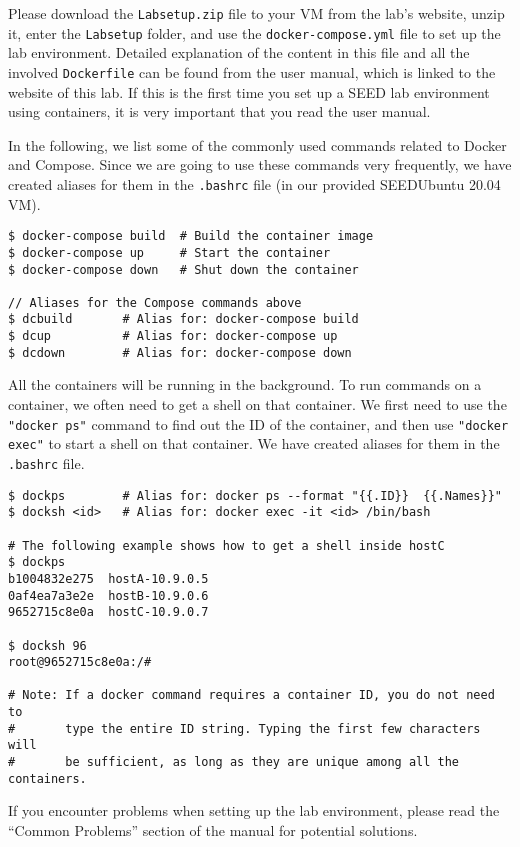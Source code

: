 Please download the
\texttt{Labsetup.zip} file to your VM from the lab's website,
unzip it, enter the \texttt{Labsetup} folder, and 
use the \texttt{docker-compose.yml} file to 
set up the lab environment. Detailed explanation
of the content in this file and all the involved 
\texttt{Dockerfile} can be found from the 
user manual, which is linked to the website of this lab.
If this is the first time you set up a SEED lab environment
using containers, it is very important that you read 
the user manual. 

In the following, we list some of the commonly
used commands related to Docker and Compose. 
Since we are going to use 
these commands very frequently, we have created aliases for them
in the \texttt{.bashrc} file (in our provided SEEDUbuntu 20.04 VM).


\begin{lstlisting}
$ docker-compose build  # Build the container image
$ docker-compose up     # Start the container
$ docker-compose down   # Shut down the container

// Aliases for the Compose commands above
$ dcbuild       # Alias for: docker-compose build
$ dcup          # Alias for: docker-compose up
$ dcdown        # Alias for: docker-compose down
\end{lstlisting}


All the containers will be running in the background. To run
commands on a container, we often need to get a shell on
that container. We first need to use the \texttt{"docker ps"}  
command to find out the ID of the container, and then
use \texttt{"docker exec"} to start a shell on that 
container. We have created aliases for them in
the \texttt{.bashrc} file.

\begin{lstlisting}
$ dockps        # Alias for: docker ps --format "{{.ID}}  {{.Names}}" 
$ docksh <id>   # Alias for: docker exec -it <id> /bin/bash

# The following example shows how to get a shell inside hostC
$ dockps
b1004832e275  hostA-10.9.0.5
0af4ea7a3e2e  hostB-10.9.0.6
9652715c8e0a  hostC-10.9.0.7

$ docksh 96
root@9652715c8e0a:/#  

# Note: If a docker command requires a container ID, you do not need to 
#       type the entire ID string. Typing the first few characters will 
#       be sufficient, as long as they are unique among all the containers. 
\end{lstlisting}


If you encounter problems when setting up the lab environment, 
please read the ``Common Problems'' section of the manual
for potential solutions.

